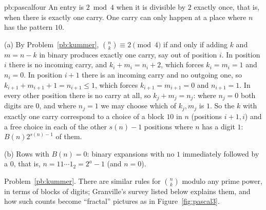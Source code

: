 \begin{solution}{pb:pascalfour}
\idea An entry is $2\bmod4$ when it is divisible by $2$ exactly once, that is, when there is exactly one carry. One carry can only
happen at a place where $n$ has the pattern $10$.

\writeup (a) By Problem~\ref{pb:kummer}, $\binom nk\equiv2\pmod4$ if and only if adding $k$ and $m=n-k$ in binary produces exactly one carry,
say out of position $i$. In position $i$ there is no incoming carry, and $k_i+m_i=n_i+2$, which forces $k_i=m_i=1$ and $n_i=0$. In
position $i+1$ there is an incoming carry and no outgoing one, so $k_{i+1}+m_{i+1}+1=n_{i+1}\le1$, which forces $k_{i+1}=m_{i+1}=0$ and
$n_{i+1}=1$. In every other position there is no carry at all, so $k_j+m_j=n_j$: where $n_j=0$ both digits are $0$, and where $n_j=1$
we may choose which of $k_j,m_j$ is $1$. So the $k$ with exactly one carry correspond to a choice of a block $10$ in $n$ (positions
$i+1,i$) and a free choice in each of the other $s(n)-1$ positions where $n$ has a digit $1$: $B(n)2^{s(n)-1}$ of them.

(b) Rows with $B(n)=0$: binary expansions with no $1$ immediately followed by a $0$, that is, $n=11\cdots1_2=2^a-1$ (and $n=0$).

\tools Problem~\ref{pb:kummer}.
\leads There are similar rules for $\binom nk$ modulo any prime power, in terms of blocks of digits; Granville's survey listed
below explains them, and how such counts become ``fractal'' pictures as in Figure~\ref{fig:pascal3}.
\end{solution}

